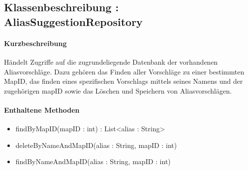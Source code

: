 \subsection{Klassenbeschreibung : AliasSuggestionRepository}%
\paragraph*{Kurzbeschreibung}
Händelt Zugriffe auf die zugrundeliegende Datenbank der vorhandenen Aliasvorschläge.
Dazu gehören das Finden aller Vorschläge zu einer bestimmten MapID, das finden eines spezifischen Vorschlags mittels 
seines Namens und der zugehörigen mapID sowie das Löschen und Speichern von Aliasvorschlägen.
\paragraph*{Enthaltene Methoden}
\begin{itemize}
    \item findByMapID(mapID : int) : List<alias : String>
    \item deleteByNameAndMapID(alias : String, mapID : int) 
    \item findByNameAndMapID(alias : String, mapID : int) 
\end{itemize}